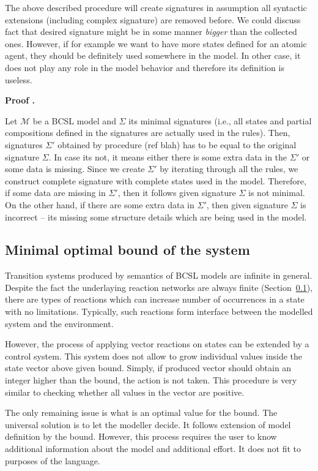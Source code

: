 \documentclass[12pt]{fithesis2}
\newcounter{counter}[section]
\renewcommand{\thecounter}{\thesection.\arabic{counter}}
\newenvironment{proof}{\bigskip\refstepcounter{counter}\noindent\textbf{Proof \thecounter}\par\nopagebreak}{\bigskip}
\begin{document}
The above described procedure will create signatures in assumption all syntactic extensions (including complex signature) are removed before. We could discuss fact that desired signature might be in some manner \emph{bigger} than the collected ones. However, if for example we want to have more states defined for an atomic agent, they should be definitely used somewhere in the model. In other case, it does not play any role in the model behavior and therefore its definition is useless. 

\begin{proof}
Let $\mathcal{M}$ be a BCSL model and $\Sigma$ its minimal signatures (i.e., all states and partial compositions defined in the signatures are actually used in the rules). Then, signatures $\Sigma'$ obtained by procedure (ref blah) has to be equal to the original signature $\Sigma$. In case its not, it means either there is some extra data in the $\Sigma'$ or some data is missing. Since we create $\Sigma'$ by iterating through all the rules, we construct complete signature with complete states used in the model. Therefore, if some data are missing in $\Sigma'$, then it follows given signature $\Sigma$ is not minimal. On the other hand, if there are some extra data in $\Sigma'$, then given signature $\Sigma$ is incorrect -- its missing some structure details which are being used in the model.
\end{proof}

\subsection{Minimal optimal bound of the system}
\label{optimal_bound}

Transition systems produced by semantics of BCSL models are infinite in general. Despite the fact the underlaying reaction networks are always finite (Section~\ref{optimal_bound}), there are types of reactions which can increase number of occurrences in a state with no limitations. Typically, such reactions form interface between the modelled system and the environment.

However, the process of applying vector reactions on states can be extended by a control system. This system does not allow to grow individual values inside the state vector above given bound. Simply, if produced vector should obtain an integer higher than the bound, the action is not taken. This procedure is very similar to checking whether all values in the vector are positive.

The only remaining issue is what is an optimal value for the bound. The universal solution is to let the modeller decide. It follows extension of model definition by the bound. However, this process requires the user to know additional information about the model and additional effort. It does not fit to purposes of the language.
\end{document}
